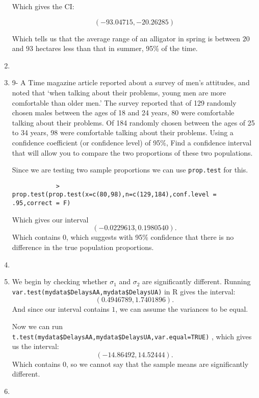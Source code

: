 \documentclass{article}
\begin{document}
\begin{enumerate}
        Which gives the CI:

        $$(-93.04715,-20.26285)$$

        Which tells us that the average range of an alligator in spring is between $20$ and $93$ hectares less than that in summer, 95\% of the time.
    \item 
    \item 9-
        A Time magazine article reported about a survey of men’s attitudes, and noted that ‘when talking about
their problems, young men are more comfortable than older men.’ The survey reported that of 129 randomly
chosen males between the ages of 18 and 24 years, 80 were comfortable talking about their problems. Of
184 randomly chosen between the ages of 25 to 34 years, 98 were comfortable talking about their problems.
Using a confidence coefficient (or confidence level) of 95\%, Find a confidence interval that will allow you to
compare the two proportions of these two populations. 

Since we are testing two sample proportions we can use \verb|prop.test| for this.
        \begin{verbatim}
            > prop.test(prop.test(x=c(80,98),n=c(129,184),conf.level = .95,correct = F)
        \end{verbatim}
        Which gives our interval
        \[
            \left( -0.0229613,0.1980540 \right) 
        .\] 
        Which contains 0, which suggests with 95\% confidence that there is no difference in the true population proportions.
    \item 
\item We begin by checking whether $\sigma_1$ and $\sigma_2$ are significantly different. Running 
    \\\verb|var.test(mydata$DelaysAA,mydata$DelaysUA)| in R gives the interval:
    \[
        \left( 0.4946789,1.7401896 \right) 
    .\] 
    And since our interval contains $1$, we can assume the variances to be equal.
    
    Now we can run 
    \verb|t.test(mydata$DelaysAA,mydata$DelaysUA,var.equal=TRUE)|
    , which gives us the interval:
    \[
        (-14.86492, 14.52444)
    .\] 
    Which contains $0$, so we cannot say that the sample means are significantly 
    different.
    \item 

\end{enumerate}
\end{document}
